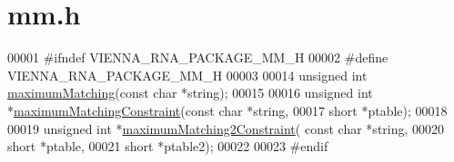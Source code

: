 \hypertarget{mm_8h_source}{}\section{mm.\+h}
\label{mm_8h_source}

\begin{DoxyCode}
00001 \textcolor{preprocessor}{#ifndef VIENNA\_RNA\_PACKAGE\_MM\_H}
00002 \textcolor{preprocessor}{#define VIENNA\_RNA\_PACKAGE\_MM\_H}
00003 
00014 \textcolor{keywordtype}{unsigned} \textcolor{keywordtype}{int}  \mbox{\hyperlink{mm_8h_a9b098b01f0ffa3f25eecc83bb4ce362d}{maximumMatching}}(\textcolor{keyword}{const} \textcolor{keywordtype}{char} *\textcolor{keywordtype}{string});
00015 
00016 \textcolor{keywordtype}{unsigned} \textcolor{keywordtype}{int} *\mbox{\hyperlink{mm_8h_a8bbdeeb5c97c8e0d6165b382cee37d6c}{maximumMatchingConstraint}}(\textcolor{keyword}{const} \textcolor{keywordtype}{char} *\textcolor{keywordtype}{string},
00017                                         \textcolor{keywordtype}{short} *ptable);
00018 
00019 \textcolor{keywordtype}{unsigned} \textcolor{keywordtype}{int} *\mbox{\hyperlink{mm_8h_ad2a9b01961304ea1711ad5be8c0efead}{maximumMatching2Constraint}}( \textcolor{keyword}{const} \textcolor{keywordtype}{char} *\textcolor{keywordtype}{string},
00020                                           \textcolor{keywordtype}{short} *ptable,
00021                                           \textcolor{keywordtype}{short} *ptable2);
00022 
00023 \textcolor{preprocessor}{#endif}
\end{DoxyCode}
